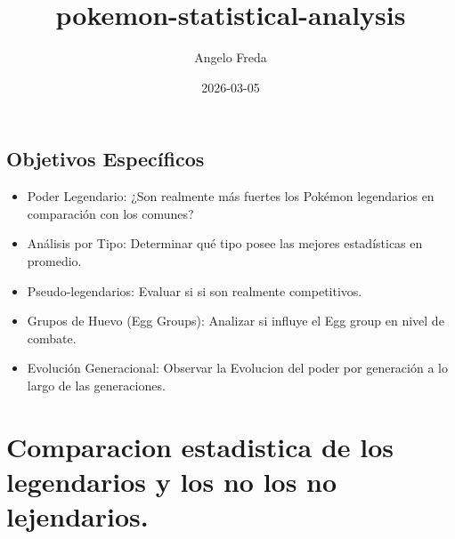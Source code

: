 \documentclass[
]{article}
\title{pokemon-statistical-analysis}
\author{Angelo Freda}
\date{2026-03-05}
\begin{document}
\maketitle

{
\setcounter{tocdepth}{2}
\tableofcontents
}
\subsection{Objetivos Específicos}
\begin{itemize}
  \item{Poder Legendario: ¿Son realmente más fuertes los Pokémon legendarios en comparación con los comunes?}
  \item{Análisis por Tipo: Determinar qué tipo posee las mejores estadísticas en promedio.}
  \item{Pseudo-legendarios: Evaluar si si son realmente competitivos.}
  \item{Grupos de Huevo (Egg Groups): Analizar si influye el Egg group en nivel de combate.}
  \item{Evolución Generacional: Observar la Evolucion del poder por generación a lo largo de las generaciones.}
\end{itemize}

\section{Comparacion estadistica de los legendarios y los no los no
lejendarios.}\label{comparacion-estadistica-de-los-legendarios-y-los-no-los-no-lejendarios.}
\end{document}
